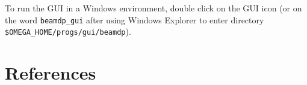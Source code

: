 \documentclass[12pt,twoside]{article}
\begin{document}
To run the GUI in a Windows environment, double click on the GUI icon
(or on the word {\tt beamdp\_gui} after using Windows Explorer to enter
directory {\tt \$OMEGA\_HOME/progs/gui/beamdp}).

\section{References}
\renewcommand{\rightmark}{References}
\vspace*{-1cm}
\setlength{\baselineskip}{0.5cm}


\end{document}
